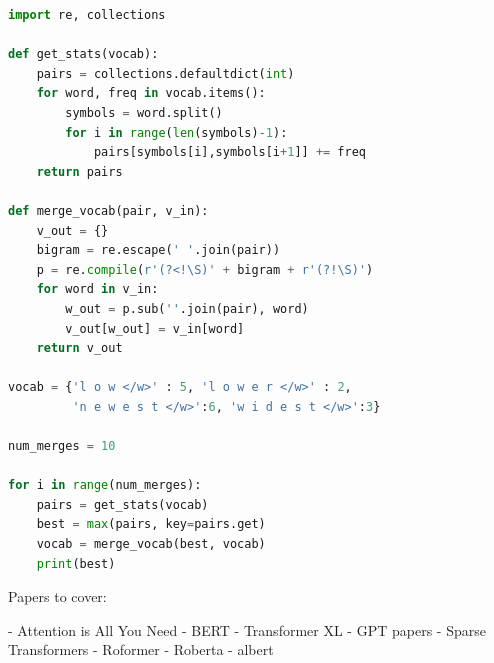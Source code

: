 \documentclass[11pt]{article}
\theoremstyle{definition}
\begin{document}
\begin{minipage}{\linewidth}
\begin{lstlisting}[language=Python, caption=Byte-Pair Encoding]
import re, collections

def get_stats(vocab):
    pairs = collections.defaultdict(int)
    for word, freq in vocab.items():
        symbols = word.split()
        for i in range(len(symbols)-1):
            pairs[symbols[i],symbols[i+1]] += freq
    return pairs

def merge_vocab(pair, v_in):
    v_out = {}
    bigram = re.escape(' '.join(pair))
    p = re.compile(r'(?<!\S)' + bigram + r'(?!\S)')
    for word in v_in:
        w_out = p.sub(''.join(pair), word)
        v_out[w_out] = v_in[word]
    return v_out

vocab = {'l o w </w>' : 5, 'l o w e r </w>' : 2,
         'n e w e s t </w>':6, 'w i d e s t </w>':3}

num_merges = 10

for i in range(num_merges):
    pairs = get_stats(vocab)
    best = max(pairs, key=pairs.get)
    vocab = merge_vocab(best, vocab)
    print(best)

\end{lstlisting}
\end{minipage}

Papers to cover:

- Attention is All You Need
- BERT
- Transformer XL
- GPT papers
- Sparse Transformers
- Roformer
- Roberta
- albert

\end{document}
